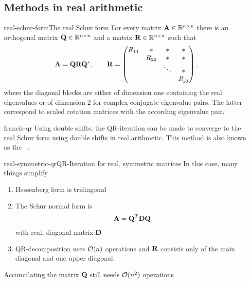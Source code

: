 \subsection{Methods in real arithmetic}

\begin{Theorem*}{real-schur-form}{The real Schur form}
  For every matrix $\mathbf A\in \mathbb R^{n\times n}$ there is an orthogonal matrix
  $\mathbf Q\in\mathbb R^{n\times n}$ and a matrix $\mathbf R\in\mathbb R^{n\times n}$ such that
  \begin{gather}
    \mathbf A = \mathbf Q\mathbf R\mathbf Q^*,
    \qquad
    \mathbf R =
    \begin{pmatrix}
      R_{11} &* & *&*\\
      &R_{22}&*&*\\
      &&\ddots&*\\
      &&& R_{jj}
    \end{pmatrix},
  \end{gather}
  where the diagonal blocks are either of dimension one containing the
  real eigenvalues or of dimension 2 for complex conjugate eigenvalue
  pairs. The latter correspond to scaled rotation matrices with the
  according eigenvalue pair.
\end{Theorem*}

\begin{Remark}{francis-qr}
  Using double shifts, the QR-iteration can be made to converge to the
  real Schur form using double shifts in real arithmetic. This method
  is also known as the ~\cite[Algorithm
  7.5-1]{GolubVanLoan83}.
\end{Remark}

\begin{Remark*}{real-symmetric-qr}{QR-Iteration for real, symmetric matrices}
  In this case, many things simplify
  \begin{enumerate}
  \item Hessenberg form is tridiagonal
  \item The Schur normal form is
    \begin{gather}
      \mathbf A = \mathbf Q^T\mathbf D\mathbf Q
    \end{gather}
    with real, diagonal matrix $\mathbf D$
  \item QR-decomposition uses $\mathcal O(n)$ operations and $\mathbf R$
    consists only of the main diagonal and one upper diagonal.
  \end{enumerate}
  Accumulating the matrix $\mathbf Q$ still needs $\mathcal O(n^2)$ operations
\end{Remark*}

